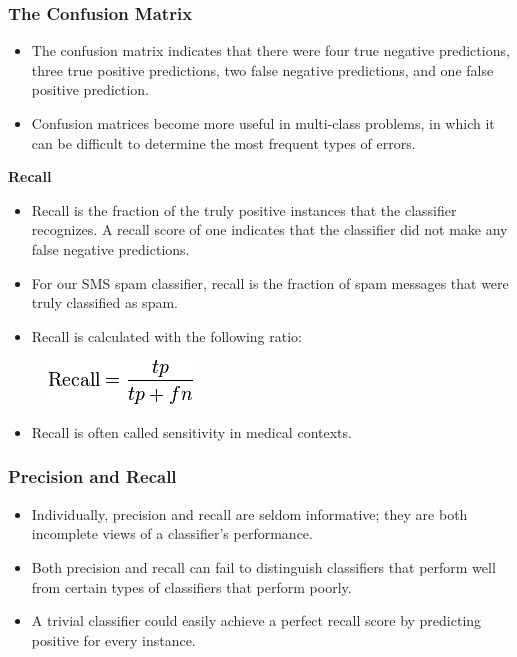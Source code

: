 \documentclass[PredictiveAnalytics101.tex]{subfiles}
\begin{document}
\begin{frame}
	\frametitle{The Confusion Matrix}
	\begin{itemize}
		\item The confusion matrix indicates that there were four true negative predictions, three
		true positive predictions, two false negative predictions, and one false positive
		prediction. 
		\item Confusion matrices become more useful in multi-class problems, in
		which it can be difficult to determine the most frequent types of errors.
	\end{itemize}
	
\end{frame}
\begin{frame}
	\textbf{Recall}
\begin{itemize}
\item   Recall is the fraction of the truly
positive instances that the classifier recognizes. A recall score of one indicates
that the classifier did not make any false negative predictions. 

\item For our SMS spam
classifier, recall is the fraction of spam messages that were truly classified as spam.
\item Recall is calculated with the following ratio:
\end{itemize}

\begin{figure}
\centering
\includegraphics[width=0.5\linewidth]{recall}

\end{figure}
\begin{itemize}
\item Recall is often called sensitivity in medical contexts.
\end{itemize}

\end{frame}
\begin{frame}
\frametitle{Precision and Recall}
	\Large
\begin{itemize}
\item Individually, precision and recall are seldom informative; they are both incomplete
views of a classifier's performance. 
\item Both precision and recall can fail to distinguish
classifiers that perform well from certain types of classifiers that perform poorly.
\item A
trivial classifier could easily achieve a perfect recall score by predicting positive for
every instance.
\end{itemize}
 
\end{frame}
\end{document}
